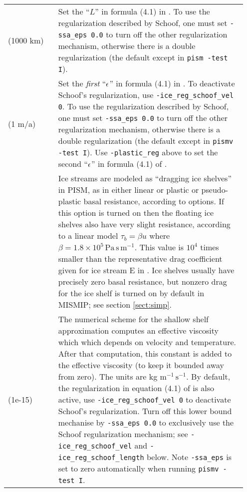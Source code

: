 \begin{center}
  \begin{xtabular}{p{0.2\linewidth}p{0.75\linewidth}}
   \label{tab:ssausage} 
 (1000 km) & Set the ``$L$'' in formula (4.1) in \cite{SchoofStream}.  To use the regularization described by Schoof, one must set \texttt{-ssa_eps 0.0} to turn off the other regularization mechanism, otherwise there is a double regularization (the default except in \texttt{pism -test I}). \\
 (1 m/a) & Set the \emph{first} ``$\epsilon$'' in formula (4.1) in \cite{SchoofStream}.  To deactivate Schoof's regularization, use \texttt{-ice_reg_schoof_vel 0}.  To use the regularization described by Schoof, one must set \texttt{-ssa_eps 0.0} to turn off the other regularization mechanism, otherwise there is a double regularization (the default except in \texttt{pismv -test I}).  Use \texttt{-plastic_reg} above to set the second ``$\epsilon$'' in formula (4.1) of \cite{SchoofStream}. \\
 & Ice streams are modeled as ``dragging ice shelves'' in PISM, as in either linear \cite{MacAyeal} or plastic \cite{SchoofStream} or pseudo-plastic basal resistance, according to options.  If this option is turned on then the floating ice shelves also have very slight resistance, according to a linear model $\tau_b = \beta u$ where $\beta = 1.8\times 10^5\, \text{Pa}\,\text{s}\,\text{m}^{-1}$.  This value is $10^4$ times smaller than the representative drag coefficient given for ice stream E in \cite{HulbeMacAyeal}.  Ice shelves usually have precisely zero basal resistance, but nonzero drag for the ice shelf is turned on by default in MISMIP; see section \ref{sect:simp}. \\
 (1e-15) & The numerical scheme for the shallow shelf approximation  \cite{WeisGreveHutter} computes an effective viscosity which which depends on velocity and temperature.  After that computation, this constant is added to the effective viscosity (to keep it bounded away from zero).  The units are kg $\text{m}^{-1}\,\text{s}^{-1}$.  By default, the regularization in equation (4.1) of \cite{SchoofStream} is also active, use \texttt{-ice_reg_schoof_vel 0} to deactivate Schoof's regularization. Turn off this lower bound mechanise by \texttt{-ssa_eps 0.0} to exclusively use the Schoof regularization mechanism; see \texttt{-ice_reg_schoof_vel} and \texttt{-ice_reg_schoof_length} below.  Note \texttt{-ssa_eps} is set to zero automatically when running \texttt{pismv -test I}. \\

\end{xtabular}
\end{center}
